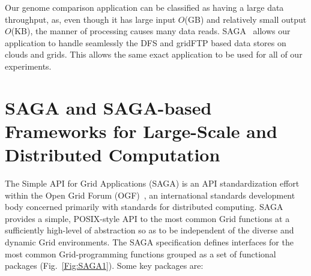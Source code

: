 \documentclass{rspublic}
\newcommand{\micnote}[1]{ {\textcolor{blue} { ***Michael: #1 }}}
\newcommand{\betynote}[1]{ {\textcolor{orange} { ***Bety: #1 }}}
\newcommand{\jhanote}[1]{} \newcommand{\micnote}[1]{}\newcommand{\betynote}[1]{} \newcommand{\fixme}[1]{}
\begin{document}

Our genome comparison application can be classified as having a large
data throughput, as, even though it has large input $O$(GB) and
relatively small output $O$(KB), the manner of processing causes many
data reads. SAGA~\citep{saga_url} allows our application to handle
seamlessly the DFS and gridFTP based data stores on clouds and grids.
This allows the same exact application to be used for all of our
experiments. 

\section{SAGA and SAGA-based Frameworks for Large-Scale and
  Distributed Computation}\label{Sec:SAGA}


The Simple API for Grid Applications (SAGA) is an API
standardization effort within the Open Grid Forum
(OGF)~\cite{saga_gfd90}, an international standards development body
concerned primarily with standards for distributed computing. SAGA
provides a simple, POSIX-style API to the most common Grid functions
at a sufficiently high-level of abstraction so as to be independent of
the diverse and dynamic Grid environments. The SAGA specification
defines interfaces for the most common Grid-programming functions
grouped as a set of functional packages (Fig.~\ref{Fig:SAGA1}). Some
key packages are:
\end{document}
